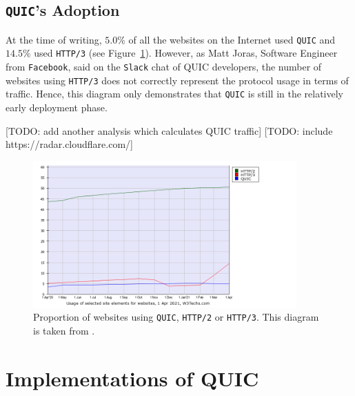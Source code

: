 \documentclass[12pt,a4paper,twoside,openright]{report}
\begin{document}
\subsection{\texttt{QUIC}'s Adoption}

At the time of writing, $5.0\%$ of all the websites on the Internet used \texttt{QUIC} and $14.5\%$ used \texttt{HTTP/3} \cite{bib_Adoption_comparison_Between_http2_http3_quic}
(see Figure~\ref{fig:Adoption_comparison_Between_http2_http3_quic}).
However, as Matt Joras, Software Engineer from \texttt{Facebook}, said on the \texttt{Slack} chat of QUIC developers, the number of websites using \texttt{HTTP/3} does not correctly represent the protocol usage in terms of traffic. 
Hence, this diagram only demonstrates that \texttt{QUIC} is still in the relatively early deployment phase.

[TODO: add another analysis which calculates QUIC traffic]
[TODO: include https://radar.cloudflare.com/]


    \begin{figure}[ht]
    \centering
    \includegraphics[width=0.9\textwidth]{figs/Adoption_comparison_Between_http2_http3_quic.png}
    \caption{Proportion of websites using \texttt{QUIC}, \texttt{HTTP/2} or \texttt{HTTP/3}. This diagram is taken from \cite{bib_Adoption_comparison_Between_http2_http3_quic}.}
    \label{fig:Adoption_comparison_Between_http2_http3_quic}
    \end{figure}









\section{Implementations of QUIC}
\end{document}
